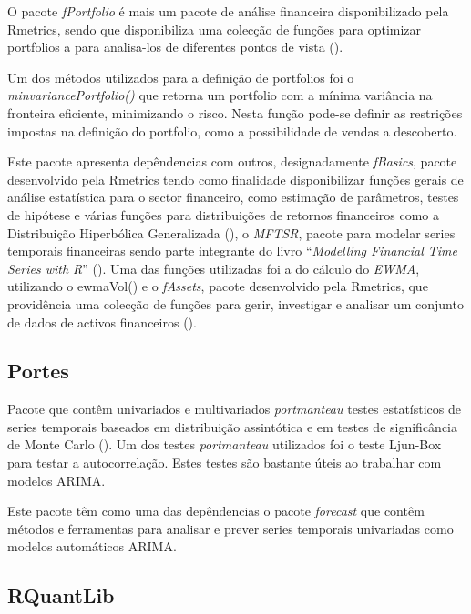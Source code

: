 \documentclass[
  12pt,
  a4paper,
  openany]{book}
\begin{document}
O pacote \emph{fPortfolio} é mais um pacote de análise financeira disponibilizado pela Rmetrics, sendo que disponibiliza uma colecção de funções para optimizar portfolios a para analisa-los de diferentes pontos de vista (\citet{fPortfolio}).

Um dos métodos utilizados para a definição de portfolios foi o \emph{minvariancePortfolio()} que retorna um portfolio com a mínima variância na fronteira eficiente, minimizando o risco. Nesta função pode-se definir as restrições impostas na definição do portfolio, como a possibilidade de vendas a descoberto.

Este pacote apresenta depêndencias com outros, designadamente \emph{fBasics}, pacote desenvolvido pela Rmetrics tendo como finalidade disponibilizar funções gerais de análise estatística para o sector financeiro, como estimação de parâmetros, testes de hipótese e várias funções para distribuições de retornos financeiros como a Distribuição Hiperbólica Generalizada (\citet{fBasics}), o \emph{MFTSR}, pacote para modelar series temporais financeiras sendo parte integrante do livro ``\emph{Modelling Financial Time Series with R}'' (\citet{MFTSR}). Uma das funções utilizadas foi a do cálculo do \emph{EWMA}, utilizando o ewmaVol() e o \emph{fAssets}, pacote desenvolvido pela Rmetrics, que providência uma colecção de funções para gerir, investigar e analisar um conjunto de dados de activos financeiros (\citet{fAssets}).

\hypertarget{portes}{%
\subsection{Portes}\label{portes}}

Pacote que contêm univariados e multivariados \emph{portmanteau} testes estatísticos de series temporais baseados em distribuição assintótica e em testes de significância de Monte Carlo (\citet{portes}). Um dos testes \emph{portmanteau} utilizados foi o teste Ljun-Box para testar a autocorrelação. Estes testes são bastante úteis ao trabalhar com modelos ARIMA.

Este pacote têm como uma das depêndencias o pacote \emph{forecast} que contêm métodos e ferramentas para analisar e prever series temporais univariadas como modelos automáticos ARIMA.

\hypertarget{rquantlib}{%
\subsection{RQuantLib}\label{rquantlib}}
\end{document}
